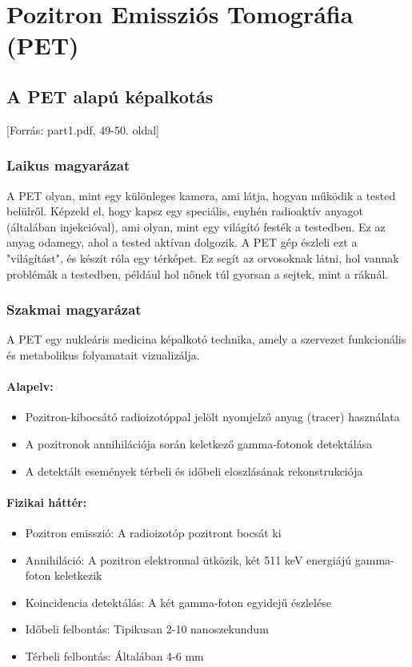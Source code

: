 \documentclass[a4paper,12pt]{article}
\begin{document}
\newpage

\section{Pozitron Emissziós Tomográfia (PET)}

\subsection{A PET alapú képalkotás} [Forrás: part1.pdf, 49-50. oldal]

\subsubsection{Laikus magyarázat} A PET olyan, mint egy különleges kamera, ami látja, hogyan működik a tested belülről. Képzeld el, hogy kapsz egy speciális, enyhén radioaktív anyagot (általában injekcióval), ami olyan, mint egy világító festék a testedben. Ez az anyag odamegy, ahol a tested aktívan dolgozik. A PET gép észleli ezt a "világítást", és készít róla egy térképet. Ez segít az orvosoknak látni, hol vannak problémák a testedben, például hol nőnek túl gyorsan a sejtek, mint a ráknál.

\subsubsection{Szakmai magyarázat} A PET egy nukleáris medicina képalkotó technika, amely a szervezet funkcionális és metabolikus folyamatait vizualizálja.

\paragraph{Alapelv:} \begin{itemize} \item Pozitron-kibocsátó radioizotóppal jelölt nyomjelző anyag (tracer) használata \item A pozitronok annihilációja során keletkező gamma-fotonok detektálása \item A detektált események térbeli és időbeli eloszlásának rekonstrukciója \end{itemize}

\paragraph{Fizikai háttér:} \begin{itemize} \item Pozitron emisszió: A radioizotóp pozitront bocsát ki \item Annihiláció: A pozitron elektronnal ütközik, két 511 keV energiájú gamma-foton keletkezik \item Koincidencia detektálás: A két gamma-foton egyidejű észlelése \item Időbeli felbontás: Tipikusan 2-10 nanoszekundum \item Térbeli felbontás: Általában 4-6 mm \end{itemize}
\end{document}
